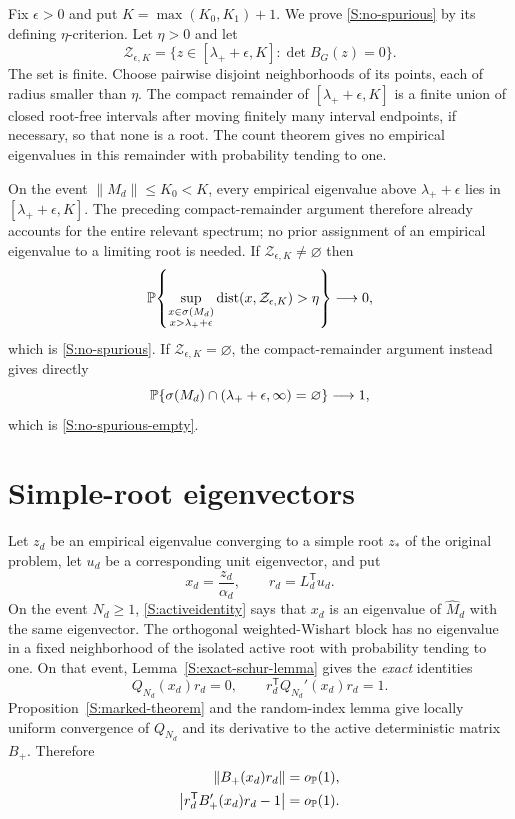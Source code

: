 Fix $\epsilon>0$ and put $K=\max(K_0,K_1)+1$. We prove
\eqref{S:no-spurious} by its defining $\eta$-criterion. Let $\eta>0$ and
let
\begin{equation}
\mathcal Z_{\epsilon,K}
=
\{z\in[\lambda_++\epsilon,K]:\det B_G(z)=0\}.
\end{equation}
The set is finite. Choose pairwise disjoint neighborhoods of its points,
each of radius smaller than $\eta$. The compact remainder of
$[\lambda_++\epsilon,K]$ is a finite union of closed root-free intervals
after moving finitely many interval endpoints, if necessary, so that none
is a root. The count theorem gives no empirical eigenvalues in this
remainder with probability tending to one.

On the event $\|M_d\|\le K_0<K$, every empirical eigenvalue above
$\lambda_++\epsilon$ lies in $[\lambda_++\epsilon,K]$.  The preceding
compact-remainder argument therefore already accounts for the entire
relevant spectrum; no prior assignment of an empirical eigenvalue to a
limiting root is needed.  If $\mathcal Z_{\epsilon,K}\ne\varnothing$ then
\begin{equation}
\mathbb{P}\!\left\{
\sup_{\substack{x\in\sigma(M_d)\\x>\lambda_++\epsilon}}
\operatorname{dist}(x,\mathcal Z_{\epsilon,K})>\eta
\right\}\longrightarrow0,
\end{equation}
which is \eqref{S:no-spurious}. If
$\mathcal Z_{\epsilon,K}=\varnothing$, the compact-remainder argument
instead gives directly
\begin{equation}
\mathbb{P}\{\sigma(M_d)\cap(\lambda_++\epsilon,\infty)=\varnothing\}
\longrightarrow1,
\end{equation}
which is \eqref{S:no-spurious-empty}.


\section{Simple-root eigenvectors}

Let $z_d$ be an empirical eigenvalue converging to a simple root $z_*$ of
the original problem, let $u_d$ be a corresponding unit eigenvector, and
put
\begin{equation}
x_d=\frac{z_d}{\alpha_d},
\qquad
r_d=L_d^{\mathsf T}u_d.
\end{equation}
On the event $N_d\ge1$, \eqref{S:activeidentity} says that $x_d$ is an
eigenvalue of $\widehat M_d$ with the same eigenvector. The orthogonal
weighted-Wishart block has no eigenvalue in a fixed neighborhood of the
isolated active root with probability tending to one. On that event,
Lemma~\ref{S:exact-schur-lemma} gives the \emph{exact} identities
\begin{equation}
Q_{N_d}(x_d)r_d=0,
\qquad
r_d^{\mathsf T}Q_{N_d}'(x_d)r_d=1.
\label{S:active-exact-evec}
\end{equation}
Proposition~\ref{S:marked-theorem} and the random-index lemma give locally
uniform convergence of $Q_{N_d}$ and its derivative to the active
deterministic matrix $B_+$. Therefore
\begin{align}
\|B_+(x_d)r_d\|&=o_{\mathbb{P}}(1),\label{S:active-evec}\\
\left|r_d^{\mathsf T}B_+'(x_d)r_d-1\right|&=o_{\mathbb{P}}(1).
\label{S:active-evec-norm}
\end{align}

